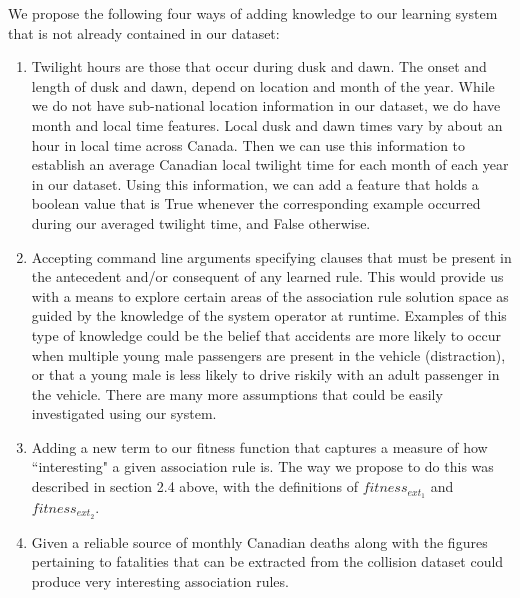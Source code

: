 \documentclass{amsart}
\theoremstyle{definition}
\theoremstyle{remark}
\numberwithin{equation}{section}
\begin{document}
We propose the following four ways of adding knowledge to our learning system that is not already contained in our dataset:
\begin{enumerate}
	\item Twilight hours are those that occur during dusk and dawn. The onset and length of dusk and dawn, depend on location and month of the year. While we do not have sub-national location information in our dataset, we do have month and local time features. Local dusk and dawn times vary by about an hour in local time across Canada. Then we can use this information \cite{riseset} to establish an average Canadian local twilight time for each month of each year in our dataset. Using this information, we can add a feature that holds a boolean value that is True whenever the corresponding example occurred during our averaged twilight time, and False otherwise.
	\item Accepting command line arguments specifying clauses that must be present in the antecedent and/or consequent of any learned rule. This would provide us with a means to explore certain areas of the association rule solution space as guided by the knowledge of the system operator at runtime. Examples of this type of knowledge could be the belief that accidents are more likely to occur when multiple young male passengers are present in the vehicle (distraction), or that a young male is less likely to drive riskily with an adult passenger in the vehicle. There are many more assumptions that could be easily investigated using our system.
\item Adding a new term to our fitness function that captures a measure of how ``interesting" a given association rule is. The way we propose to do this was described in section 2.4 above, with the definitions of $fitness_{ext_1}$ and $fitness_{ext_2}$.
    \item Given a reliable source of monthly Canadian deaths\cite{deaths} along with the figures pertaining to fatalities that can be extracted from the collision dataset could produce very interesting association rules. 

\end{enumerate}
\end{document}
